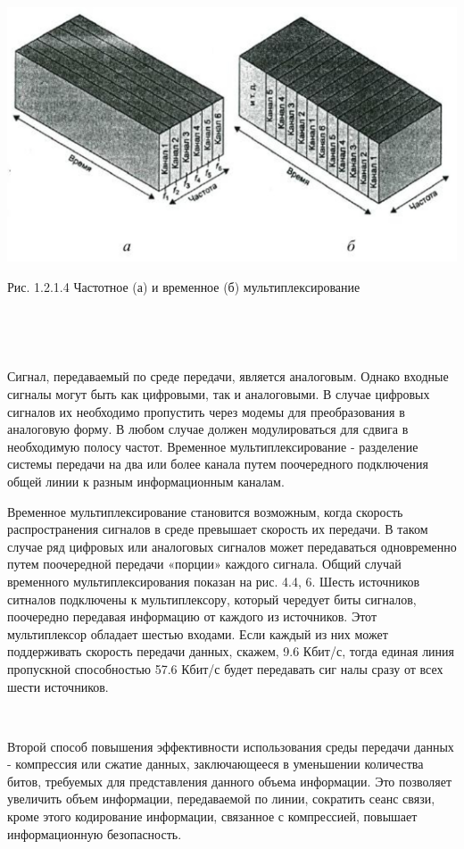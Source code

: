 \documentclass[a4paper]{report}
\begin{document}
\includegraphics[scale=1.6]{69}
{\centering\caption{\newline Рис. 1.2.1.4 Частотное (а) и временное (б) мультиплексирование }\\}

~

Сигнал, передаваемый по среде передачи, является аналоговым. Однако входные сигналы могут быть как цифровыми, так и аналоговыми. В случае цифровых сигналов их необходимо пропустить через модемы для преобразования в аналоговую форму. В любом случае должен модулироваться для сдвига в необходимую полосу частот.
\newpage
Временное мультиплексирование - разделение системы передачи на два или более канала путем поочередного подключения общей линии к разным информационным каналам.

Временное мультиплексирование становится возможным, когда скорость распространения сигналов в среде превышает скорость их передачи. В таком случае ряд цифровых или аналоговых сигналов может передаваться одновременно путем поочередной передачи «порции» каждого сигнала. Общий случай временного мультиплексирования показан на рис. 4.4, 6. Шесть источников ситналов подключены к мультиплексору, который чередует биты сигналов, поочередно передавая информацию от каждого из источников. Этот мультиплексор обладает шестью входами. Если каждый из них может поддерживать скорость передачи данных, скажем,
9.6 Кбит/с, тогда единая линия пропускной способностью 57.6 Кбит/с будет передавать сиг налы сразу от всех шести источников.

~

Второй способ повышения эффективности использования среды передачи данных - компрессия или сжатие данных, заключающееся в уменьшении количества битов, требуемых для представления данного объема информации. Это позволяет увеличить объем информации, передаваемой по линии, сократить сеанс связи, кроме этого кодирование информации, связанное с компрессией, повышает информационную безопасность.
\end{document}
